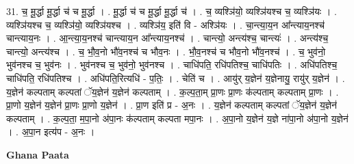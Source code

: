 \documentclass[17pt]{extarticle}
\begin{document}
31. च॒ मू॒र्द्धा मू॒र्द्धा च॑ च मू॒र्द्धा । . मू॒र्द्धा च॑ च मू॒र्द्धा मू॒र्द्धा च॑ । . च॒ व्यश्ञि॑यो॒ व्यश्ञि॑यश्च च॒ व्यश्ञि॑यः । . व्यश्ञि॑यश्च च॒ व्यश्ञि॑यो॒ व्यश्ञि॑यश्च । . व्यश्ञि॑य॒ इति॑ वि - अश्ञि॑यः । . चा॒न्त्या॒य॒न आ᳚न्त्याय॒नश्च॑ चान्त्याय॒नः । . आ॒न्त्या॒य॒नश्च॑ चान्त्याय॒न आ᳚न्त्याय॒नश्च॑ । . चान्त्यो॒ अन्त्य॑श्च॒ चान्त्यः॑ । . अन्त्य॑श्च॒ चान्त्यो॒ अन्त्य॑श्च । . च॒ भौ॒व॒नो भौ॑व॒नश्च॑ च भौव॒नः । . भौ॒व॒नश्च॑ च भौव॒नो भौ॑व॒नश्च॑ । . च॒ भुव॑नो॒ भुव॑नश्च च॒ भुव॑नः । . भुव॑नश्च च॒ भुव॑नो॒ भुव॑नश्च । . चाधि॑पति॒ रधि॑पतिश्च॒ चाधि॑पतिः । . अधि॑पतिश्च॒ चाधि॑पति॒ रधि॑पतिश्च । . अधि॑पति॒रित्यधि॑ - प॒तिः॒ । . चेति॑ च । . आयु॑र् य॒ज्ञेन॑ य॒ज्ञेनायु॒ रायु॑र् य॒ज्ञेन॑ । . य॒ज्ञेन॑ कल्पताम् कल्पतां ॅय॒ज्ञेन॑ य॒ज्ञेन॑ कल्पताम् । . क॒ल्प॒ता॒म् प्रा॒णः प्रा॒णः क॑ल्पताम् कल्पताम् प्रा॒णः । . प्रा॒णो य॒ज्ञेन॑ य॒ज्ञेन॑ प्रा॒णः प्रा॒णो य॒ज्ञेन॑ । . प्रा॒ण इति॑ प्र - अ॒नः । . य॒ज्ञेन॑ कल्पताम् कल्पतां ॅय॒ज्ञेन॑ य॒ज्ञेन॑ कल्पताम् । . क॒ल्प॒ता॒ म॒पा॒नो अ॑पा॒नः क॑ल्पताम् कल्पता मपा॒नः । . अ॒पा॒नो य॒ज्ञेन॑ य॒ज्ञे ना॑पा॒नो अ॑पा॒नो य॒ज्ञेन॑ । . अ॒पा॒न इत्य॑प - अ॒नः । \newline

\textbf{Ghana Paata } \newline
\end{document}
